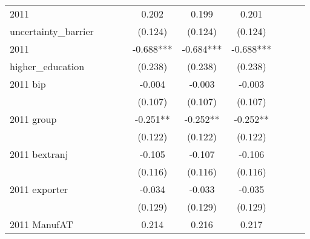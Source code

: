 \begin{table}[htbp]
\begin{tabular}{l*{9}{c}}
2011                &               &               &               &       0.202   &       0.199   &       0.201   &               &               &               \\
uncertainty\_barrier &               &               &               &     (0.124)   &     (0.124)   &     (0.124)   &               &               &               \\
2011                &               &               &               &      -0.688***&      -0.684***&      -0.688***&               &               &               \\
higher\_education    &               &               &               &     (0.238)   &     (0.238)   &     (0.238)   &               &               &               \\
2011 bip            &               &               &               &      -0.004   &      -0.003   &      -0.003   &               &               &               \\
                    &               &               &               &     (0.107)   &     (0.107)   &     (0.107)   &               &               &               \\
2011 group          &               &               &               &      -0.251** &      -0.252** &      -0.252** &               &               &               \\
                    &               &               &               &     (0.122)   &     (0.122)   &     (0.122)   &               &               &               \\
2011 bextranj       &               &               &               &      -0.105   &      -0.107   &      -0.106   &               &               &               \\
                    &               &               &               &     (0.116)   &     (0.116)   &     (0.116)   &               &               &               \\
2011 exporter       &               &               &               &      -0.034   &      -0.033   &      -0.035   &               &               &               \\
                    &               &               &               &     (0.129)   &     (0.129)   &     (0.129)   &               &               &               \\
2011 ManufAT        &               &               &               &       0.214   &       0.216   &       0.217   &               &               &               \\

\end{tabular}
\end{table}
